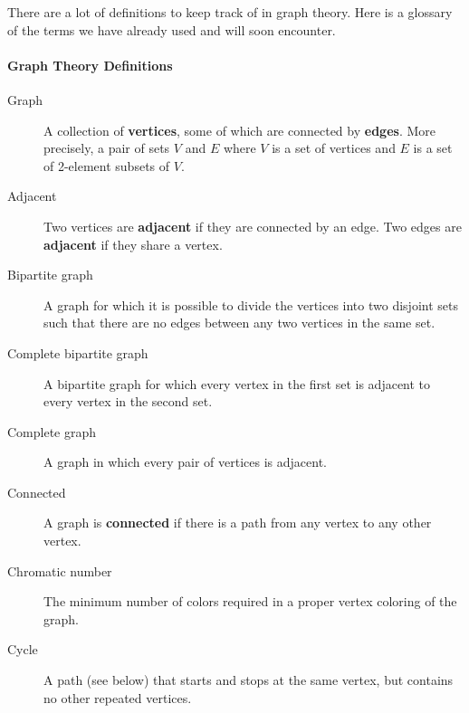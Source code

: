 \documentclass[10pt,]{book}
\newcommand{\terminology}[1]{\textbf{#1}}
\theoremstyle{plain}
\theoremstyle{definition}
\theoremstyle{definition}
\theoremstyle{definition}
\numberwithin{equation}{chapter}
\begin{document}
\par
\hypertarget{p-105}{}%
There are a lot of definitions to keep track of in graph theory.  Here is a glossary of the terms we have already used and will soon encounter.%
\typeout{************************************************}
\typeout{************************************************}
\paragraph[{Graph Theory Definitions}]{Graph Theory Definitions}\hypertarget{paragraphs-3}{}
\hypertarget{p-106}{}%
\leavevmode%
\begin{description}
\item[{Graph}]\hypertarget{li-9}{}\hypertarget{p-107}{}%
 A collection of \terminology{vertices}, some of which are connected by \terminology{edges}. More precisely, a pair of sets \(V\) and \(E\) where \(V\) is a set of vertices and \(E\) is a set of 2-element subsets of \(V\).%
\item[{Adjacent}]\hypertarget{li-10}{}\hypertarget{p-108}{}%
 Two vertices are \terminology{adjacent} if they are connected by an edge. Two edges are \terminology{adjacent} if they share a vertex.%
\item[{Bipartite graph}]\hypertarget{li-11}{}\hypertarget{p-109}{}%
 A graph for which it is possible to divide the vertices into two disjoint sets such that there are no edges between any two vertices in the same set.%
\item[{Complete bipartite graph}]\hypertarget{li-12}{}\hypertarget{p-110}{}%
A bipartite graph for which every vertex in the first set is adjacent to every vertex in the second set.%
\item[{Complete graph}]\hypertarget{li-13}{}\hypertarget{p-111}{}%
 A graph in which every pair of vertices is adjacent.%
\item[{Connected}]\hypertarget{li-14}{}\hypertarget{p-112}{}%
 A graph is \terminology{connected} if there is a path from any vertex to any other vertex.%
\item[{Chromatic number}]\hypertarget{li-15}{}\hypertarget{p-113}{}%
 The minimum number of colors required in a proper vertex coloring of the graph.%
\item[{Cycle}]\hypertarget{li-16}{}\hypertarget{p-114}{}%
 A path (see below) that starts and stops at the same vertex, but contains no other repeated vertices.%

\end{description}
\end{document}
